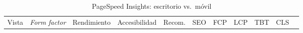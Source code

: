 \begin{longtable}[]{@{}
  >{\raggedright\arraybackslash}p{}
  >{\raggedright\arraybackslash}p{}
  >{\raggedright\arraybackslash}p{}
  >{\raggedright\arraybackslash}p{}
  >{\raggedright\arraybackslash}p{}
  >{\raggedright\arraybackslash}p{}
  >{\raggedright\arraybackslash}p{}
  >{\raggedright\arraybackslash}p{}
  >{\raggedright\arraybackslash}p{}
  >{\raggedright\arraybackslash}p{}
  >{\raggedright\arraybackslash}p{}@{}}
\caption[PageSpeed Insights: escritorio vs.~móvil]{PageSpeed Insights: escritorio vs.~móvil}\tabularnewline
\toprule\noalign{}
\begin{minipage}[b]{\linewidth}\raggedright
Vista
\end{minipage} & \begin{minipage}[b]{\linewidth}\raggedright
\emph{Form factor}
\end{minipage} & \begin{minipage}[b]{\linewidth}\raggedright
Rendimiento
\end{minipage} & \begin{minipage}[b]{\linewidth}\raggedright
Accesibilidad
\end{minipage} & \begin{minipage}[b]{\linewidth}\raggedright
Recom.
\end{minipage} & \begin{minipage}[b]{\linewidth}\raggedright
SEO
\end{minipage} & \begin{minipage}[b]{\linewidth}\raggedright
FCP
\end{minipage} & \begin{minipage}[b]{\linewidth}\raggedright
LCP
\end{minipage} & \begin{minipage}[b]{\linewidth}\raggedright
TBT
\end{minipage} & \begin{minipage}[b]{\linewidth}\raggedright
CLS
\end{minipage} & \begin{minipage}[b]{\linewidth}\raggedright

\end{minipage}
\end{longtable}
